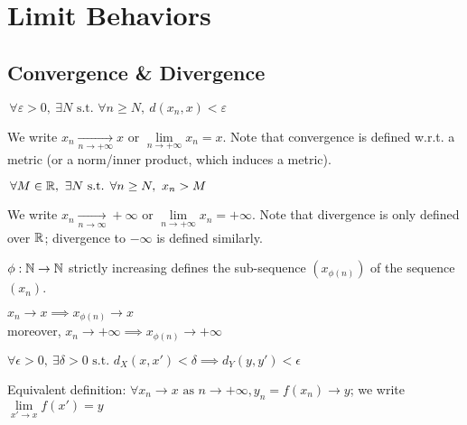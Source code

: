 \chapter{Limit Behaviors}


\section{Convergence \& Divergence}

\begin{definition}
	$\,\forall \varepsilon > 0, \ \exists N \text{ s.t. } \forall n \geq N, \ d(x_n,x) < \varepsilon$
\end{definition}
We write $x_n \xrightarrow[n \to +\infty]{} x \text{ or } \lim\limits_{n \to +\infty} x_n = x$.
Note that convergence is defined w.r.t. a metric (or a norm/inner product, which induces a metric).

\begin{definition}
	$\,\forall M \in \mathbb{R}, \ \exists N \text{ s.t. } \forall n \geq N, \ x_n > M$
\end{definition}
We write $x_n \xrightarrow[n \to \infty]{} +\infty \text{ or } \lim\limits_{n \to +\infty} x_n = +\infty$.
Note that divergence is only defined over $\mathbb{R}$; divergence to $-\infty$ is defined similarly.

\begin{definition}
	$\phi: \mathbb{N} \to \mathbb{N}$ strictly increasing defines the sub-sequence $(x_{\phi(n)})$ of the sequence $(x_n)$.
\end{definition}

\begin{property}
	$x_n \to x \implies x_{\phi(n)} \to x$ \\
	moreover, $x_n \to +\infty \implies x_{\phi(n)} \to +\infty$
\end{property}

\begin{definition}[$f:X \to Y$ converges to $y \in Y$ at $x \in X$]
	$\forall \epsilon>0, \ \exists \delta>0 \text{ s.t. } d_X(x,x')<\delta \implies d_Y(y,y')<\epsilon$
\end{definition}
Equivalent definition: $\forall x_n \to x \text{ as } n \to +\infty, y_n = f(x_n) \to y$; we write $\lim\limits_{x' \to x} f(x') = y$

